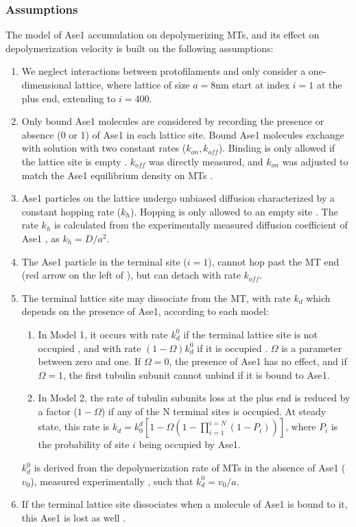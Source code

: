 \subsubsection{Assumptions}
The model of Ase1 accumulation on depolymerizing MTs, and its effect on depolymerization velocity  is built on the following assumptions:
\begin{enumerate}
	\item We neglect interactions between protofilaments and only consider a one-dimensional lattice, where lattice of size $a=8$nm start at index $i=1$ at the plus end, extending to $i=400$. 
	\item Only bound Ase1 molecules are considered by recording the presence or absence (0 or 1) of Ase1 in each lattice site. Bound Ase1 molecules exchange with solution with two constant rates ($k_{on},k_{off}$). Binding is only allowed if the lattice site is empty . $k_{off}$ was directly measured, and $k_{on}$ was adjusted to match the Ase1 equilibrium density on MTs .
	\item Ase1 particles on the lattice undergo unbiased diffusion characterized by a constant hopping rate ($k_h$). Hopping is only allowed to an empty site . The rate $k_h$ is calculated from the experimentally measured diffusion coefficient of Ase1 , as $k_h=D/a^2$.
	\item The Ase1 particle in the terminal site ($i=1$), cannot hop past the MT end (red arrow on the left of ), but can detach with rate $k_{off}$.
	\item The terminal lattice site may dissociate from the MT, with rate $k_d$ which depends on the presence of Ase1, according to each model:
	\begin{enumerate}
		\item In Model 1, it occurs with rate $k_d^0$ if the terminal lattice site is not occupied , and with rate $(1-\Omega)k_d^0$ if it is occupied . $\Omega$ is a parameter between zero and one. If $\Omega=0$, the presence of Ase1 has no effect, and if $\Omega=1$, the first tubulin subunit cannot unbind if it is bound to Ase1.
		\item In Model 2, the rate of tubulin subunits loss at the plus end is reduced by a factor ($1-\Omega$) if any of the N terminal sites is occupied. At steady state, this rate is $k_d=k_0^d [1-\Omega(1-\prod_{i=1}^{i=N}(1-P_i))]$, where $P_i$ is the probability of site $i$ being occupied by Ase1.
	\end{enumerate} 
	$k_d^0$ is derived from the depolymerization rate of MTs in the absence of Ase1 ($v_0$), measured experimentally , such that  $k_d^0=v_0/a$.
	\item If the terminal lattice site dissociates when a molecule of Ase1 is bound to it, this Ase1 is lost as well .
\end{enumerate}
	
